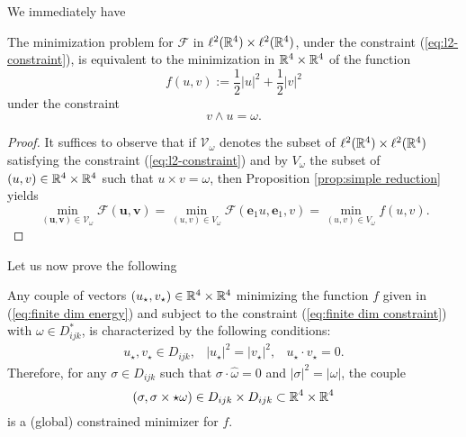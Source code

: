We immediately have

\begin{corollary}
\label{cor:simple reduction}
The minimization problem for $\mathcal{F}$ in $\ell^2(\mathbb{R}^4) \times \ell^2(\mathbb{R}^4)$, under the constraint (\ref{eq:l2-constraint}), is equivalent to the minimization in $\mathbb{R}^4 \times \mathbb{R}^4$ of the function
\begin{equation}
\label{eq:finite dim energy}
 	f(u,v) := \frac{1}{2}|u|^2 + \frac{1}{2} |v|^2
 \end{equation} 
 under the constraint
 \begin{equation}
 \label{eq:finite dim constraint}
 v \wedge u = \omega.
 \end{equation}
\end{corollary}

\begin{proof}
It suffices to observe that if $\mathcal{V}_{\omega}$ denotes the subset of $\ell^2(\mathbb{R}^4) \times \ell^2(\mathbb{R}^4)$ satisfying the constraint (\ref{eq:l2-constraint}) and by $V_{\omega}$ the subset of $(u, v)  \in \mathbb{R}^4 \times \mathbb{R}^4$ such that $u \times v = \omega$, then Proposition \ref{prop:simple reduction} yields
\begin{equation}
\min_{(\mathbf{u}, \mathbf{v}) \in \mathcal{V}_{\omega}}\mathcal{F}(\mathbf{u}, \mathbf{v}) = \min_{(u, v) \in V_\omega} \mathcal{F}(\mathbf{e}_1 u, \mathbf{e}_1, v) = \min_{(u,v) \in V_{\omega}} f(u,v).
\end{equation}
\end{proof}

Let us now prove the following


\begin{proposition}
\label{prop:finite dim minimization}
Any couple of vectors $(u_{\star}, v_{\star}) \in \mathbb{R}^4 \times \mathbb{R}^4$ minimizing the function $f$ given in (\ref{eq:finite dim energy}) and subject to the constraint (\ref{eq:finite dim constraint}) with $\omega \in D_{ijk}^{*}$, is characterized by the following conditions:
\begin{eqnarray}
\label{eq:finite dim minimization conditions}
u_{\star}, v_{\star} \in D_{ijk}, & 
|u_{\star}|^2 = |v_{\star}|^2, & 
u_{\star} \cdot v_{\star} = 0.
\end{eqnarray}
Therefore, for any $\sigma \in D_{ijk}$ such that $\sigma \cdot \hat{\omega} = 0$ and $|\sigma|^2 = |\omega|$, the couple
\begin{equation}
(\sigma, \sigma \times \star \omega) \in D_{ijk} \times D_{ijk} \subset \mathbb{R}^4 \times \mathbb{R}^4
\end{equation}
is a (global) constrained minimizer for $f$.
\end{proposition}

